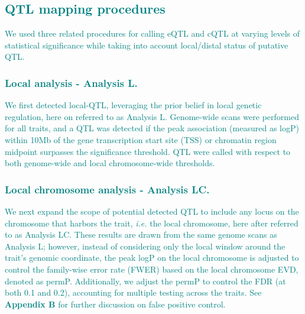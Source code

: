\documentclass[9pt,twocolumn,twoside]{gsajnl}
\newcommand{\ie}{\emph{i.e.}\xspace}
\newcommand{\WV}[2]{\textcolor{red}{#1\footnote{\textcolor{red}{WV: #2}}}}
\newcommand{\WVinline}[1]{\textcolor{red}{#1}}
\newcommand{\GKinline}[1]{\textcolor{teal}{#1}}
\begin{document}
\subsection{\GKinline{QTL mapping procedures}}
\GKinline{We used three related procedures for calling eQTL and cQTL at varying levels of statistical significance while taking into account local/distal status of putative QTL.}

\subsubsection{\GKinline{Local analysis - Analysis L.}} 
\GKinline{We first detected local-QTL, leveraging the prior belief in local genetic regulation, here on referred to as Analysis L. Genome-wide scans were performed for all traits, and a QTL was detected if the peak association (measured as logP) within 10Mb of the gene transcription start site (TSS) or chromatin region midpoint surpasses the significance threshold. QTL were called with respect to both genome-wide and local chromosome-wide thresholds.}

\subsubsection{\GKinline{Local chromosome analysis - Analysis LC.}} 
\GKinline{We next expand the scope of potential detected QTL to include any locus on the chromosome that harbors the trait, \ie the local chromosome, here after referred to as Analysis LC. These results are drawn from the same genome scans as Analysis L; however, instead of considering only the local window around the trait's genomic coordinate, the peak logP on the local chromosome is adjusted to control the family-wise error rate (FWER) based on the local chromosome EVD, denoted as permP. Additionally, we adjust the permP to control the FDR (at both 0.1 and 0.2), accounting for multiple testing across the traits. See \textbf{Appendix B} for further discussion on false positive control.}
\end{document}

